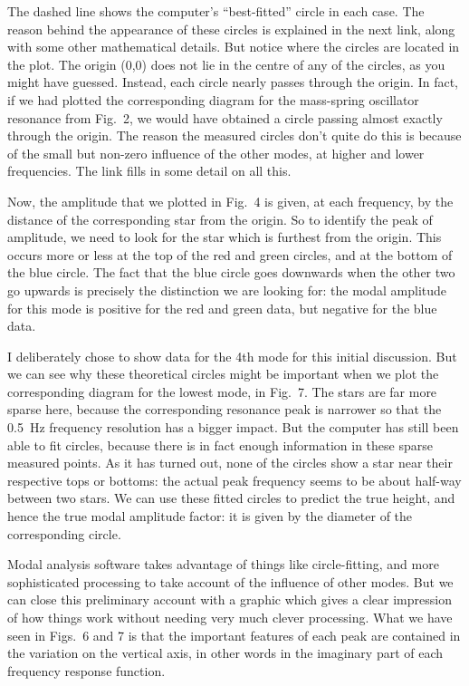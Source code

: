   The dashed line shows the computer’s “best-fitted” circle in each case. The 
  reason behind the appearance of these circles is explained in the next link, 
  along with some other mathematical details. But notice where the circles are 
  located in the plot. The origin (0,0) does not lie in the centre of any of 
  the circles, as you might have guessed. Instead, each circle nearly passes 
  through the origin. In fact, if we had plotted the corresponding diagram for 
  the mass-spring oscillator resonance from Fig.\ 2, we would have obtained a 
  circle passing almost exactly through the origin. The reason the measured 
  circles don’t quite do this is because of the small but non-zero influence of 
  the other modes, at higher and lower frequencies. The link fills in some 
  detail on all this. 

  Now, the amplitude that we plotted in Fig.\ 4 is given, at each frequency, by 
  the distance of the corresponding star from the origin. So to identify the 
  peak of amplitude, we need to look for the star which is furthest from the 
  origin. This occurs more or less at the top of the red and green circles, and 
  at the bottom of the blue circle. The fact that the blue circle goes 
  downwards when the other two go upwards is precisely the distinction we are 
  looking for: the modal amplitude for this mode is positive for the red and 
  green data, but negative for the blue data. 

  I deliberately chose to show data for the 4th mode for this initial 
  discussion. But we can see why these theoretical circles might be important 
  when we plot the corresponding diagram for the lowest mode, in Fig.\ 7. The 
  stars are far more sparse here, because the corresponding resonance peak is 
  narrower so that the 0.5~Hz frequency resolution has a bigger impact. But the 
  computer has still been able to fit circles, because there is in fact enough 
  information in these sparse measured points. As it has turned out, none of 
  the circles show a star near their respective tops or bottoms: the actual 
  peak frequency seems to be about half-way between two stars. We can use these 
  fitted circles to predict the true height, and hence the true modal amplitude 
  factor: it is given by the diameter of the corresponding circle. 


  Modal analysis software takes advantage of things like circle-fitting, and 
  more sophisticated processing to take account of the influence of other 
  modes. But we can close this preliminary account with a graphic which gives a 
  clear impression of how things work without needing very much clever 
  processing. What we have seen in Figs.\ 6 and 7 is that the important 
  features of each peak are contained in the variation on the vertical axis, in 
  other words in the imaginary part of each frequency response function. 

